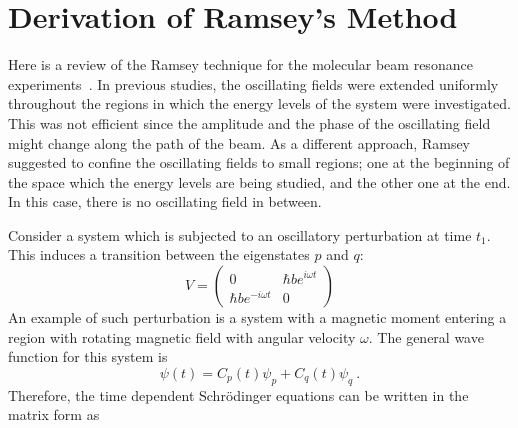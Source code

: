 \chapter{Derivation of Ramsey's Method\label{app:ramsey}}
Here is a review of the Ramsey technique for the molecular beam
resonance experiments~\cite{NMR_Notes}. In previous studies, the
oscillating fields were extended uniformly throughout the regions in
which the energy levels of the system were investigated.  This was not
efficient since the amplitude and the phase of the oscillating field
might change along the path of the beam. As a different approach,
Ramsey suggested to confine the oscillating fields to small regions;
one at the beginning of the space which the energy levels are being
studied, and the other one at the end. In this case, there is no
oscillating field in between.

Consider a system which is subjected to an oscillatory perturbation at
time $t_1$. This induces a transition between the eigenstates $p$ and $q$:
\begin{equation}
V=
\left(
\begin{array}{cc}
0 & \hbar b e^{i\omega t} \\ 
\hbar b e^{-i \omega t} & 0
\end{array} 
\right)
\end{equation}
An example of such perturbation is a system with a magnetic moment
entering a region with rotating magnetic field with angular velocity
$\omega$. The general wave function for this system is
\begin{equation}
\psi(t)= C_p (t) \psi_p + C_q(t) \psi_q~.
\end{equation}
Therefore, the time dependent Schr\"{o}dinger equations can be written
in the matrix form as

